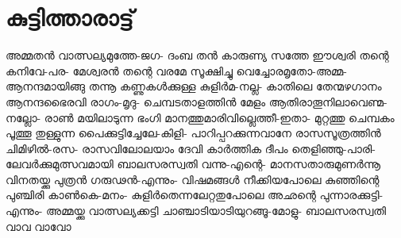 \chapter{കുട്ടിത്താരാട്ട്}
\obeylines
\noindent
അമ്മതൻ വാത്സല്യമുത്തേ-ജഗ-
ദംബ തൻ കാരുണ്യ സത്തേ
ഈശ്വരി തന്റെ കനിവേ-പര-
മേശ്വരൻ തന്റെ വരമേ
സൂക്ഷിച്ചു വെച്ചോരമൃതോ-അമ്മ-
ആനന്ദമായിങ്ങു തന്നൂ
കണ്ണുകൾക്കുള്ള കുളിർമ-നല്ല- 
കാതിലെ തേന്മഴഗാനം
ആനന്ദഭൈരവി രാഗം-മൃദു-
ചെമ്പടതാളത്തിൻ മേളം
ആതിരാതൂനിലാവെണ്മ-നല്ലോ-
രാൺ മയിലാടുന്ന ഭംഗി
മാനത്തുമാരിവില്ലെത്തീ-ഇതാ-
മുറ്റത്തു ചെമ്പകം പൂത്തൂ
തുള്ളുന്ന പൈക്കുട്ടിച്ചേലേ-കിളി-
പാറിപ്പറക്കുന്നവാനേ
രാസസൂത്രത്തിൻ ചിമിഴിൽ-രസ-
രാസവിലോലയാം ദേവി
കാർത്തിക ദീപം തെളിഞ്ഞു-പാരി-
ലേവർക്കുമുത്സവമായി
ബാലസരസ്വതി വന്നു-എന്റെ-
മാനസതാരുമുണർന്നൂ
വിനതയ്ക്കു പുത്രൻ ഗരുഢൻ-എന്നും-
വിഷമങ്ങൾ നീക്കിയപോലെ
കുഞ്ഞിന്റെ പുഞ്ചിരി കാൺകെ-മനം-
കുളിർതെന്നലേറ്റതുപോലെ
അഛന്റെ പുന്നാരക്കുട്ടി-എന്നും-
അമ്മയ്ക്കു വാത്സല്യക്കട്ടി
ചാഞ്ചാടിയാടിയുറങ്ങൂ-മോളു-
ബാലസരസ്വതി വാവ വാവോ
